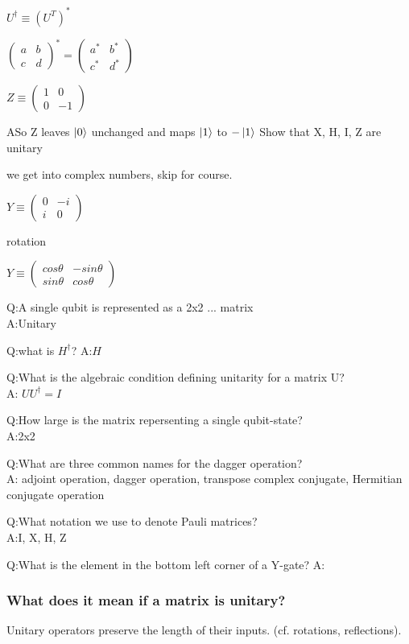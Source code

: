 \documentclass[a4paper, addpoints, 12pt
    , noanswers    %
    ]{exam}
\begin{document}
\begin{questions}
$U^{\dagger} \equiv (U^T)^* $

$\begin{pmatrix}
a&b\\
c&d
\end{pmatrix}^*
=
\begin{pmatrix}
a^*&b^*\\
c^*&d^*
\end{pmatrix}
$


$Z \equiv \begin{pmatrix}
1&0\\
0&-1
\end{pmatrix}
$

ASo Z leaves $\ket{0}$ unchanged and maps $\ket{1}$ to $-\ket{1}$
Show that X, H, I, Z are unitary



we get into complex numbers, skip for course.

$Y \equiv \begin{pmatrix}
0&-i\\
i&0
\end{pmatrix}
$

rotation

$Y \equiv \begin{pmatrix}
cos \theta & -sin \theta\\
sin \theta & cos \theta
\end{pmatrix}
$


Q:A single qubit is represented as a 2x2 ... matrix\\
A:Unitary

Q:what is $H^\dagger$?
A:$H$

Q:What is the algebraic condition defining unitarity for a matrix U?\\
A: $UU^\dagger=I$

Q:How large is the matrix repersenting a single qubit-state?\\
A:2x2

Q:What are three common names for the dagger operation?\\
A:
adjoint operation,
dagger operation,
transpose complex conjugate,
Hermitian conjugate operation

Q:What notation we use to denote Pauli matrices?\\
A:I, X, H, Z

Q:What is the element in the bottom left corner of a Y-gate?
A:

\subsubsection*{What does it mean if a matrix is unitary?}
Unitary operators preserve the length of their inputs. (cf. rotations, reflections).


\end{questions}
\end{document}
